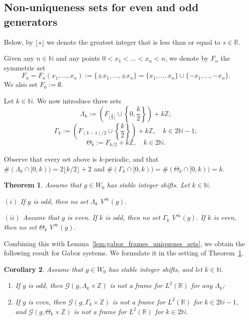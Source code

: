 \documentclass[10pt,a4paper]{amsart}
\numberwithin{equation}{section}
\newtheorem{theorem}{Theorem}[section]
\newtheorem{corollary}[theorem]{Corollary} \newcommand{\La}{\Lambda}
\newcommand{\R}{{\mathbb R}} \newcommand{\Q}{{\mathbb Q}} \newcommand{\Z}{{\mathbb Z}} \newcommand{\N}{{\mathbb N}}
\begin{document}
\subsection{Non-uniqueness sets for even and odd generators}
Below, by $\lfloor s \rfloor$ we denote the greatest integer that is less than or equal to $s\in \R.$

 Given any $n\in \N$ and any points $0<x_1<...<x_{n} <n$, we denote by $F_{n}$ the symmetric set
\begin{equation}\label{eq:set_F_def}
   F_n=F_n(x_1,...,x_n):=\{\pm x_1,...,\pm x_n\}=\{x_1,...,x_n\}\cup \{-x_1,...,-x_n\}. 
\end{equation}
We also set $F_0:=\emptyset.$

Let $k\in\mathbb N$. We now introduce three sets
\begin{equation}\label{eq:set_Lambda_def}
\Lambda_k:=\left(F_{\lfloor\frac{k}{2}\rfloor} \cup \left\{0,\frac{k}{2}\right\}\right)+k\Z;
\end{equation}
\begin{equation}\label{eq:set_Gamma_def}
\Gamma_k:= \left(F_{(k-1)/2}\cup \left\{\frac{k}{2}\right\}\right)+k\Z,\quad k\in 2\N-1; 
\end{equation}
\begin{equation}\label{eq:set_Theta_def}
\Theta_k:=F_{k/2}+k\Z,\quad k\in 2\N.
\end{equation}

Observe that every set above is $k$-periodic, and that $\#(\Lambda_k\cap [0,k))=2 \lfloor k/2 \rfloor+2$ and $\#(\Gamma_k\cap [0,k))= \#(\Theta_k\cap [0,k))=k$.


\begin{theorem}\label{non_uniq_approx_lattice}
  Assume that $g\in W_0$ has stable integer shifts.
  Let $ k\in \N.$
  
$(i)$ If $g$ is odd, then no set $\Lambda_k$    $V^{\infty}(g).$
      
$(ii)$ Assume that $g$ is even. If $k$ is odd, then  no set $\Gamma_k$    $V^{\infty}(g).$ 
      If $k$ is even, then  no set $\Theta_k$    $V^{\infty}(g).$

\end{theorem}


Combining this with Lemma~\ref{lem:gabor_frames_uniquenes_sets}, we obtain the following result for Gabor systems. We formulate it in the setting of Theorem~\ref{non_uniq_approx_lattice}.
\begin{corollary}\label{cor:Gabor_even_odd}Assume that $g\in W_0$ has stable integer shifts, and let $k\in \N.$
\begin{enumerate}
    \item[(i)] If $g$ is odd, then  $\mathcal{G}(g, \Lambda_k\times\Z)$ is not a frame for $L^2(\R)$ for any $\Lambda_k$;    
    \item[(ii)]  If $g$ is even, then  $\mathcal{G}(g, \Gamma_k\times\Z)$ is not a frame for $L^2(\R)$ for $ k \in 2\N-1,$ and $\mathcal{G}(g, \Theta_k\times\Z)$ is not a frame for $L^2(\R)$ for $ k \in 2\N$.
\end{enumerate}
\end{corollary}
\end{document}
